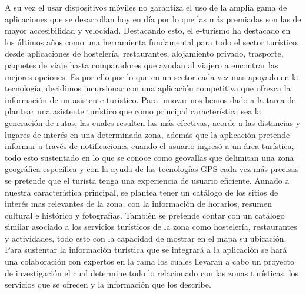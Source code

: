 	A su vez el usar dispositivos móviles no garantiza el uso de la amplia gama de aplicaciones que se desarrollan hoy en día por lo que las más premiadas son las de mayor accesibilidad y velocidad. Destacando esto, el e-turismo ha destacado en los últimos años como una herramienta fundamental para todo el sector turístico, desde aplicaciones de hostelería, restaurantes, alojamiento privado, trasporte, paquetes de viaje hasta comparadores que ayudan al viajero a encontrar las mejores opciones. Es por ello por lo que en un sector cada vez mas apoyado en la tecnología, decidimos incursionar con una aplicación competitiva que ofrezca la información de un asistente turístico.
	Para innovar nos hemos dado a la tarea de plantear una asistente turístico que como principal característica sea la generación de rutas, las cuales resulten las más efectivas, acorde a las distancias y lugares de interés en una determinada zona, además que la aplicación pretende informar a través de notificaciones cuando el usuario ingresó a un área turística, todo esto sustentado en lo que se conoce como geovallas que delimitan una zona geográfica específica y con la ayuda de las tecnologías GPS cada vez más precisas se pretende que el turista tenga una experiencia de usuario eficiente. 
	Aunado a nuestra característica principal, se plantea tener un catálogo de los sitios de interés mas relevantes de la zona, con la información de horarios, resumen cultural e histórico y fotografías. También se pretende contar con un catálogo similar asociado a los servicios turísticos de la zona como hostelería, restaurantes y actividades, todo esto con la capacidad de mostrar en el mapa su ubicación.
	Para sustentar la información turística que se integrará a la aplicación se hará una colaboración con expertos en la rama los cuales llevaran a cabo un proyecto de investigación el cual determine todo lo relacionado con las zonas turísticas, los servicios que se ofrecen y la información que los describe.
	

